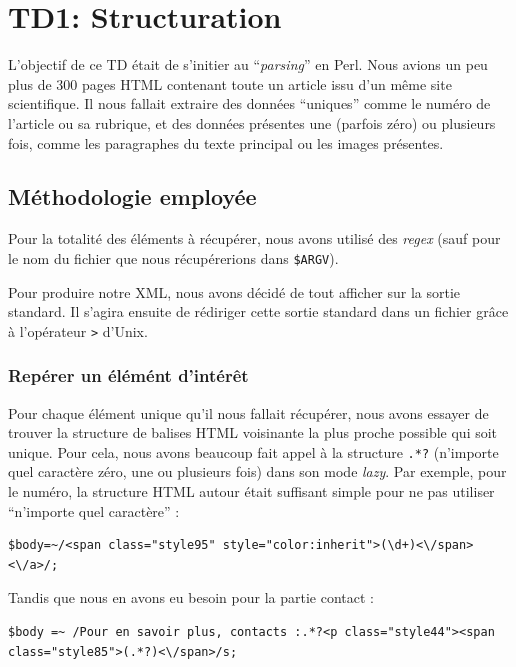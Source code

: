 \chapter{TD1: Structuration}

L'objectif de ce TD était de s'initier au ``\textit{parsing}'' en Perl. Nous avions un peu plus de 300 pages HTML contenant toute un article issu d'un même site scientifique. Il nous fallait extraire des données ``uniques'' comme le numéro de l'article ou sa rubrique, et des données présentes une (parfois zéro) ou plusieurs fois, comme les paragraphes du texte principal ou les images présentes.

\section{Méthodologie employée}

Pour la totalité des éléments à récupérer, nous avons utilisé des \textit{regex} (sauf pour le nom du fichier que nous récupérerions dans \lstinline{$ARGV}).

Pour produire notre XML, nous avons décidé de tout afficher sur la sortie standard. Il s'agira ensuite de rédiriger cette sortie standard dans un fichier grâce à l'opérateur \lstinline{>} d'Unix.

\subsection{Repérer un élémént d'intérêt}

Pour chaque élément unique qu'il nous fallait récupérer, nous avons essayer de trouver la structure de balises HTML voisinante la plus proche possible qui soit unique. Pour cela, nous avons beaucoup fait appel à la structure \lstinline{.*?} (n'importe quel caractère zéro, une ou plusieurs fois) dans son mode \textit{lazy}. Par exemple, pour le numéro, la structure HTML autour était suffisant simple pour ne pas utiliser ``n'importe quel caractère'' :

\perl
\begin{lstlisting}
$body=~/<span class="style95" style="color:inherit">(\d+)<\/span><\/a>/;
\end{lstlisting}

Tandis que nous en avons eu besoin pour la partie contact :

\begin{lstlisting}
$body =~ /Pour en savoir plus, contacts :.*?<p class="style44"><span class="style85">(.*?)<\/span>/s;
\end{lstlisting}

